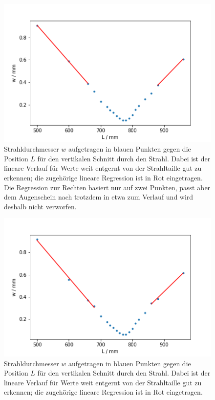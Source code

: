 \begin{figure}[h]
    \centering
    \includegraphics[scale = 0.75]{Bilder/Auswertung/gerfitv.png}
    \caption{Strahldurchmesser $w$ aufgetragen in blauen Punkten gegen die Position $L$ für den vertikalen Schnitt durch den Strahl. Dabei ist der lineare Verlauf für Werte weit entgernt von der Strahltaille 
    gut zu erkennen; die zugehörige lineare Regression ist in Rot eingetragen. Die Regression zur Rechten basiert nur auf zwei Punkten, passt aber dem Augenschein nach trotzdem in etwa zum Verlauf und wird deshalb nicht verworfen.}
    \label{pic:gerfitve}
\end{figure}

\begin{figure}[h]
    \centering
    \includegraphics[scale = 0.75]{Bilder/Auswertung/gerfith.png}
    \caption{Strahldurchmesser $w$ aufgetragen in blauen Punkten gegen die Position $L$ für den vertikalen Schnitt durch den Strahl. Dabei ist der lineare Verlauf für Werte weit entgernt von der Strahltaille 
    gut zu erkennen; die zugehörige lineare Regression ist in Rot eingetragen.}
    \label{pic:gerfithe}
\end{figure}

